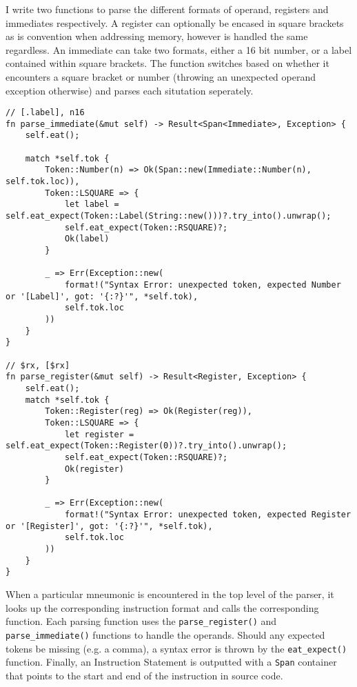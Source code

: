 I write two functions to parse the different formats of operand, registers and immediates respectively. A register can optionally be encased in square brackets as is convention when addressing memory, however is handled the same regardless. An immediate can take two formats, either a 16 bit number, or a label contained within square brackets. The function switches based on whether it encounters a square bracket or number (throwing an unexpected operand exception otherwise) and parses each situtation seperately.

\begin{lstlisting}
// [.label], n16
fn parse_immediate(&mut self) -> Result<Span<Immediate>, Exception> {
    self.eat();
    
    match *self.tok {
        Token::Number(n) => Ok(Span::new(Immediate::Number(n), self.tok.loc)),
        Token::LSQUARE => {
            let label = self.eat_expect(Token::Label(String::new()))?.try_into().unwrap();
            self.eat_expect(Token::RSQUARE)?;
            Ok(label)
        }

        _ => Err(Exception::new(
            format!("Syntax Error: unexpected token, expected Number or '[Label]', got: '{:?}'", *self.tok),
            self.tok.loc
        ))
    }
}

// $rx, [$rx]
fn parse_register(&mut self) -> Result<Register, Exception> {
    self.eat();
    match *self.tok {
        Token::Register(reg) => Ok(Register(reg)),
        Token::LSQUARE => {
            let register = self.eat_expect(Token::Register(0))?.try_into().unwrap();
            self.eat_expect(Token::RSQUARE)?;
            Ok(register)
        }

        _ => Err(Exception::new(
            format!("Syntax Error: unexpected token, expected Register or '[Register]', got: '{:?}'", *self.tok),
            self.tok.loc
        ))
    }
} 
\end{lstlisting}

When a particular mneumonic is encountered in the top level of the parser, it looks up the corresponding instruction format and calls the corresponding function. Each parsing function uses the \texttt{parse\_register()} and \texttt{parse\_immediate()} functions to handle the operands. Should any expected tokens be missing (e.g. a comma), a syntax error is thrown by the \texttt{eat\_expect()} function. Finally, an Instruction Statement is outputted with a \texttt{Span} container that points to the start and end of the instruction in source code.

